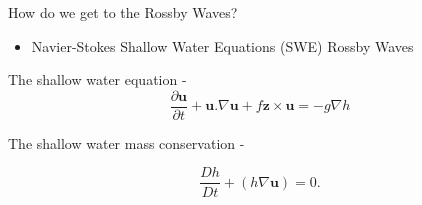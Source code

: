 \documentclass[12pt]{beamer}
\begin{document}
\begin{frame}{How do we get to the Rossby Waves?}

\begin{itemize}
\item Navier-Stokes \MVRightarrow  Shallow Water Equations (SWE) \MVRightarrow  Rossby Waves
\end{itemize}

\vspace{15pt}


The shallow water equation -
\begin{equation}
\frac{\partial{\textbf{u}}}{\partial{t}} + \textbf{u}.\nabla\textbf{u} + f \textbf{z} \times \textbf{u} = -g \nabla h
\end{equation}

The shallow water mass conservation - 

\begin{equation}
\frac{Dh}{Dt} + (h\nabla \textbf{u}) = 0.
\end{equation}
\end{frame}
%
%
%
%
%
%
%
%
\end{document}
